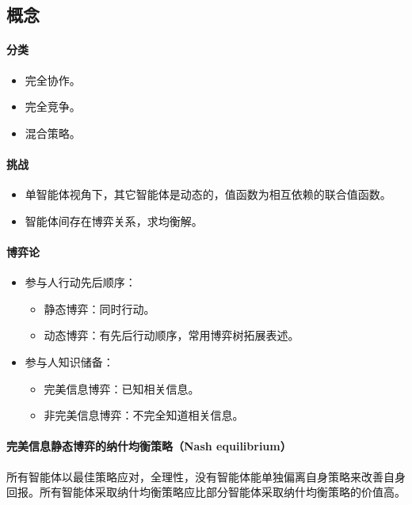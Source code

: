 \documentclass[
12pt, %
a4paper, 
oneside, %
headinclude,footinclude, %
]{scrartcl}
\begin{document}
\subsection[概念]{概念}
\noindent
\begin{minipage}{0.3\textwidth}
\paragraph{分类}
\begin{itemize}
\item 完全协作。
\item 完全竞争。
\item 混合策略。
\end{itemize}
\end{minipage}
\begin{minipage}{0.7\textwidth}
\paragraph{挑战}
\begin{itemize}
\item 单智能体视角下，其它智能体是动态的，值函数为相互依赖的联合值函数。
\item 智能体间存在博弈关系，求均衡解。
\end{itemize}
\end{minipage}
\paragraph{博弈论}
\begin{itemize}
\item 参与人行动先后顺序：
\begin{itemize}
\item 静态博弈：同时行动。
\item 动态博弈：有先后行动顺序，常用博弈树拓展表述。
\end{itemize}
\item 参与人知识储备：
\begin{itemize}
\item 完美信息博弈：已知相关信息。
\item 非完美信息博弈：不完全知道相关信息。
\end{itemize}
\end{itemize}
\paragraph{完美信息静态博弈的纳什均衡策略（Nash equilibrium）}
所有智能体以最佳策略应对，全理性，没有智能体能单独偏离自身策略来改善自身回报。所有智能体采取纳什均衡策略应比部分智能体采取纳什均衡策略的价值高。
\end{document}
